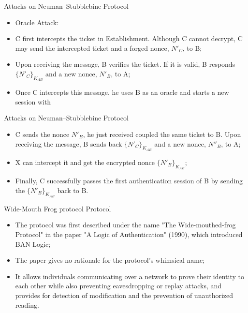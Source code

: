 \documentclass[12pt,table,xcolor={dvipsnames}]{beamer}
\begin{document}
\begin{frame}{Attacks on Neuman–Stubblebine Protocol}
\begin{itemize}
\item Oracle Attack:
\item C first intercepts the ticket in Establishment. Although C cannot decrypt, C may send the intercepted ticket and a forged nonce, $N'_{C}$, to B;\pause
\item Upon receiving the message, B verifies the ticket. If it is valid, B responds $\{N'_{C}\}_{K_{AB}}$ and a new nonce, $N'_{B}$, to A;\pause
\item Once C intercepts this message, he uses B as an oracle and starts a new session with
\end{itemize}
\end{frame}

\begin{frame}{Attacks on Neuman–Stubblebine Protocol}
\begin{itemize}
\item C sends the nonce $N'_{B}$, he just received coupled the same ticket to B. Upon receiving the message, B sends back $\{N'_{C}\}_{K_{AB}}$ and a new nonce, $N''_{B}$, to A;\pause
\item X can intercept it and get the encrypted nonce $\{N'_{B}\}_{K_{AB}}$;\pause
\item Finally, C successfully passes the first authentication session of B by sending the $\{N'_{B}\}_{K_{AB}}$ back to B.
\end{itemize}
\end{frame}

\begin{frame}{Wide-Mouth Frog protocol Protocol}
\begin{itemize}
\item The protocol was first described under the name "The Wide-mouthed-frog Protocol" in the paper "A Logic of Authentication" (1990), which introduced BAN Logic;\pause
\item The paper gives no rationale for the protocol's whimsical name;\pause
\item It allows individuals communicating over a network to prove their identity to each other while also preventing eavesdropping or replay attacks, and provides for detection of modification and the prevention of unauthorized reading.
\end{itemize}
\end{frame}
\end{document}
